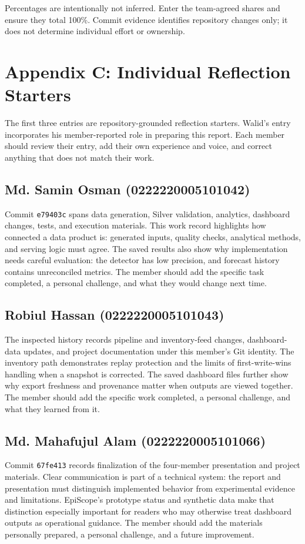﻿\documentclass[conference]{IEEEtran}
\begin{document}
Percentages are intentionally not inferred. Enter the team-agreed shares and ensure they total 100\%. Commit evidence identifies repository changes only; it does not determine individual effort or ownership.

\section*{Appendix C: Individual Reflection Starters}
The first three entries are repository-grounded reflection starters. Walid's entry incorporates his member-reported role in preparing this report. Each member should review their entry, add their own experience and voice, and correct anything that does not match their work.
\setlength{\parskip}{0.35em}

\subsection*{Md. Samin Osman (0222220005101042)}
Commit \texttt{e79403c} spans data generation, Silver validation, analytics, dashboard changes, tests, and execution materials. This work record highlights how connected a data product is: generated inputs, quality checks, analytical methods, and serving logic must agree. The saved results also show why implementation needs careful evaluation: the detector has low precision, and forecast history contains unreconciled metrics. The member should add the specific task completed, a personal challenge, and what they would change next time.

\subsection*{Robiul Hassan (0222220005101043)}
The inspected history records pipeline and inventory-feed changes, dashboard-data updates, and project documentation under this member's Git identity. The inventory path demonstrates replay protection and the limits of first-write-wins handling when a snapshot is corrected. The saved dashboard files further show why export freshness and provenance matter when outputs are viewed together. The member should add the specific work completed, a personal challenge, and what they learned from it.

\subsection*{Md. Mahafujul Alam (0222220005101066)}
Commit \texttt{67fe413} records finalization of the four-member presentation and project materials. Clear communication is part of a technical system: the report and presentation must distinguish implemented behavior from experimental evidence and limitations. EpiScope's prototype status and synthetic data make that distinction especially important for readers who may otherwise treat dashboard outputs as operational guidance. The member should add the materials personally prepared, a personal challenge, and a future improvement.
\end{document}
